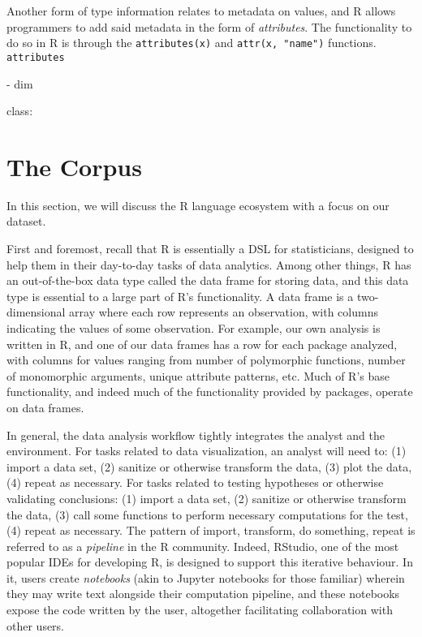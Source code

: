 \documentclass[acmsmall,10pt,review,anonymous]{acmart}\settopmatter{printfolios=true,printccs=false,printacmref=false}
\newcommand{\code}[1]{\lstinline|#1|\xspace}
\begin{document}
Another form of type information relates to metadata on values, and R allows programmers to add said metadata in the form of {\it attributes}.
The functionality to do so in R is through the \code{attributes(x)} and \code{attr(x, "name")}  functions.
\code{attributes} 

  - dim

class:

%
%

\section{The Corpus}


In this section, we will discuss the R language ecosystem with a focus on our dataset.

First and foremost, recall that R is essentially a DSL for statisticians, designed to help them in their day-to-day tasks of data analytics.
Among other things, R has an out-of-the-box data type called the data frame for storing data, and this data type is essential to a large part of R's functionality.
A data frame is a two-dimensional array where each row represents an observation, with columns indicating the values of some observation.
For example, our own analysis is written in R, and one of our data frames has a row for each package analyzed, with columns for values ranging from number of polymorphic functions, number of monomorphic arguments, unique attribute patterns, etc.
Much of R's base functionality, and indeed much of the functionality provided by packages, operate on data frames.

In general, the data analysis workflow tightly integrates the analyst and the environment.
For tasks related to data visualization, an analyst will need to: (1) import a data set, (2) sanitize or otherwise transform the data, (3) plot the data, (4) repeat as necessary.
For tasks related to testing hypotheses or otherwise validating conclusions: (1) import a data set, (2) sanitize or otherwise transform the data, (3) call some functions to perform necessary computations for the test, (4) repeat as necessary.
The pattern of import, transform, do something, repeat is referred to as a {\it pipeline} in the R community.
Indeed, RStudio, one of the most popular IDEs for developing R, is designed to support this iterative behaviour.
In it, users create {\it notebooks} (akin to Jupyter notebooks for those familiar) wherein they may write text alongside their computation pipeline, and these notebooks expose the code written by the user, altogether facilitating collaboration with other users.
\end{document}
